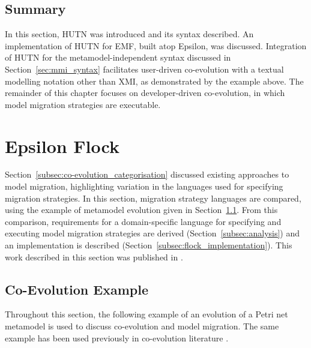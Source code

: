\subsection{Summary}
In this section, HUTN was introduced and its syntax described. An implementation of HUTN for EMF, built atop Epsilon, was discussed. Integration of HUTN for the metamodel-independent syntax discussed in Section~\ref{sec:mmi_syntax} facilitates user-driven co-evolution with a textual modelling notation other than XMI, as demonstrated by the example above. The remainder of this chapter focuses on developer-driven co-evolution, in which model migration strategies are executable.


\section{Epsilon Flock}
\label{sec:flock}
Section~\ref{subsec:co-evolution_categorisation} discussed existing approaches to model migration, highlighting variation in the languages used for specifying migration strategies. In this section, migration strategy languages are compared, using the example of metamodel evolution given in Section~\ref{subsec:co-evo_example}. From this comparison, requirements for a domain-specific language for specifying and executing model migration strategies are derived (Section~\ref{subsec:analysis}) and an implementation is described (Section~\ref{subsec:flock_implementation}). This work described in this section was published in \cite{rose10flock}.


\subsection{Co-Evolution Example}
\label{subsec:co-evo_example}
Throughout this section, the following example of an evolution of a Petri net metamodel is used to discuss co-evolution and model migration. The same example has been used previously in co-evolution literature \cite{cicchetti08automating,garces09managing,wachsmuth07metamodel}.


